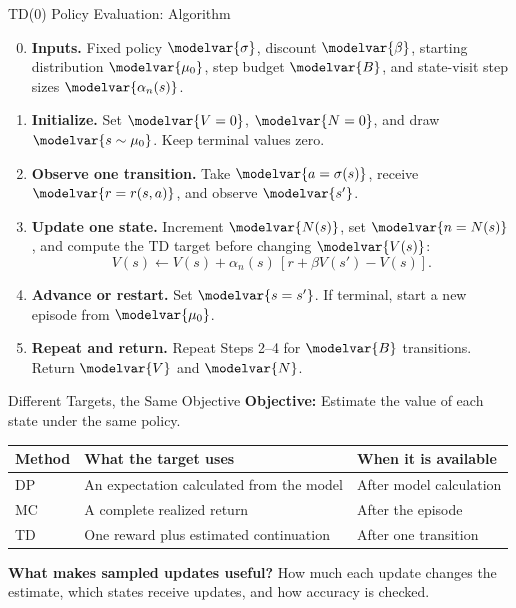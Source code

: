 \begin{frame}{TD(0) Policy Evaluation: Algorithm}
\small
\begin{enumerate}
\setcounter{enumi}{-1}
\item \textbf{Inputs.} Fixed policy \(\modelvar{\sigma}\), discount \(\modelvar{\beta}\), starting distribution \(\modelvar{\mu_0}\), step budget \(\modelvar{B}\), and state-visit step sizes \(\modelvar{\alpha_n(s)}\).
\item \textbf{Initialize.} Set \(\modelvar{V=0}\), \(\modelvar{N=0}\), and draw \(\modelvar{s\sim\mu_0}\). Keep terminal values zero.
\item \textbf{Observe one transition.} Take \(\modelvar{a=\sigma(s)}\), receive \(\modelvar{r=r(s,a)}\), and observe \(\modelvar{s'}\).
\item \textbf{Update one state.} Increment \(\modelvar{N(s)}\), set \(\modelvar{n=N(s)}\), and compute the TD target before changing \(\modelvar{V(s)}\):
\[V(s)\leftarrow V(s)+\alpha_n(s)\,[r+\beta V(s')-V(s)].\]
\item \textbf{Advance or restart.} Set \(\modelvar{s=s'}\). If terminal, start a new episode from \(\modelvar{\mu_0}\).
\item \textbf{Repeat and return.} Repeat Steps 2--4 for \(\modelvar{B}\) transitions. Return \(\modelvar{V}\) and \(\modelvar{N}\).
\end{enumerate}
\end{frame}

\begin{frame}{Different Targets, the Same Objective}
\small
\textbf{Objective:} Estimate the value of each state under the same policy.
\par\medskip
\renewcommand{\arraystretch}{1.6}
\begin{tabular}{@{}>{\raggedright\arraybackslash}p{}>{\raggedright\arraybackslash}p{}>{\raggedright\arraybackslash}p{}@{}}
\toprule
Method & What the target uses & When it is available\\\midrule
DP & An expectation calculated from the model & After model calculation\\
MC & A complete realized return & After the episode\\
TD & One reward plus estimated continuation & After one transition\\\bottomrule
\end{tabular}
\par\bigskip
\textbf{What makes sampled updates useful?} How much each update changes the estimate, which states receive updates, and how accuracy is checked.
\end{frame}

